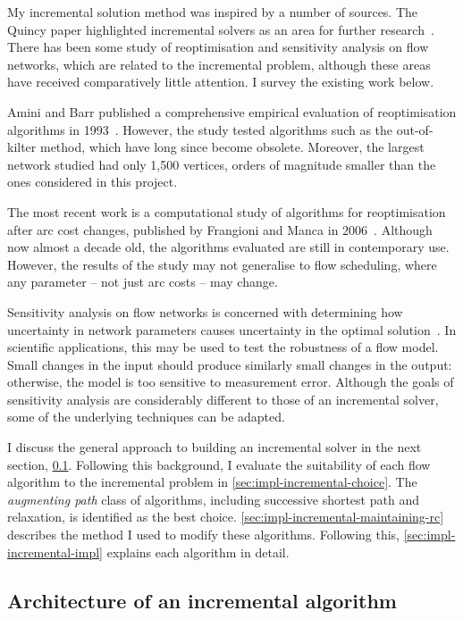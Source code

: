 My incremental solution method was inspired by a number of sources. The Quincy paper highlighted incremental solvers as an area for further research~\cite[\S6.5]{Isard:2007}. There has been some study of reoptimisation and sensitivity analysis on flow networks, which are related to the incremental problem, although these areas have received comparatively little attention. I survey the existing work below.

Amini and Barr published a comprehensive empirical evaluation of reoptimisation algorithms in 1993~\cite{Amini:1993}. However, the study tested algorithms such as the out-of-kilter method, which have long since become obsolete. Moreover, the largest network studied had only 1,500 vertices, orders of magnitude smaller than the ones considered in this project. 

The most recent work is a computational study of algorithms for reoptimisation after arc cost changes, published by Frangioni and Manca in 2006~\cite{Frangioni:2006}. Although now almost a decade old, the algorithms evaluated are still in contemporary use. However, the results of the study may not generalise to flow scheduling, where any parameter -- not just arc costs -- may change. 

Sensitivity analysis on flow networks is concerned with determining how uncertainty in network parameters causes uncertainty in the optimal solution~\cite[\S9.11]{Ahuja:1993}. In scientific applications, this may be used to test the robustness of a flow model. Small changes in the input should produce similarly small changes in the output: otherwise, the model is too sensitive to measurement error. Although the goals of sensitivity analysis are considerably different to those of an incremental solver, some of the underlying techniques can be adapted.

I discuss the general approach to building an incremental solver in the next section, \cref{sec:impl-incremental-architecture}. Following this background, I evaluate the suitability of each flow algorithm to the incremental problem in \cref{sec:impl-incremental-choice}. The \emph{augmenting path} class of algorithms, including successive shortest path and relaxation, is identified as the best choice. \cref{sec:impl-incremental-maintaining-rc} describes the method I used to modify these algorithms. Following this, \cref{sec:impl-incremental-impl} explains each algorithm in detail.

\subsection{Architecture of an incremental algorithm} \label{sec:impl-incremental-architecture}

